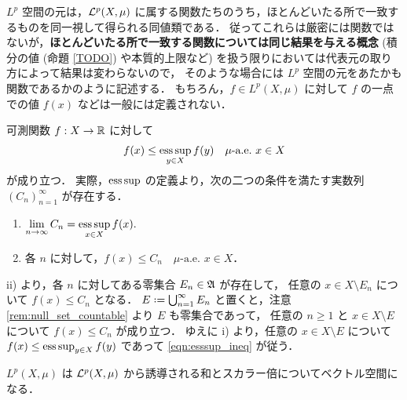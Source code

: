 \begin{remark}
    $L^p$ 空間の元は，$\mathcal{L}^p(X,\mu)$ に属する関数たちのうち，ほとんどいたる所で一致するものを同一視して得られる同値類である．
    従ってこれらは厳密には関数ではないが，\textbf{ほとんどいたる所で一致する関数については同じ結果を与える概念}
    (積分の値 (命題 \ref{TODO}) や本質的上限など) を扱う限りにおいては代表元の取り方によって結果は変わらないので，
    そのような場合には $L^p$ 空間の元をあたかも関数であるかのように記述する．
    もちろん，$f\in L^p(X,\mu)$ に対して $f$ の一点での値 $f(x)$ などは一般には定義されない．
\end{remark}

\begin{remark}\label{rem:pointwise_esssup}
    可測関数 $f:X\to\mathbb{R}$ に対して
    \begin{align}
        f(x)\le\operatorname*{ess\,sup}_{y\in X}f(y)\quad\text{$\mu$-a.e.\ $x\in X$}
        \label{eqn:esssup_ineq}
    \end{align}
    が成り立つ．
    実際，$\operatorname*{ess\,sup}$ の定義より，次の二つの条件を満たす実数列 $(C_n)_{n=1}^\infty$ が存在する．
    \begin{enumerate}
        \item $\displaystyle\lim_{n\to\infty}C_n=\operatorname*{ess\,sup}_{x\in X}f(x).$
        \item 各 $n$ に対して，$f(x)\le C_n\quad\text{$\mu$-a.e.\ $x\in X$}$．
    \end{enumerate}
    \textrm{ii)} より，各 $n$ に対してある零集合 $E_n\in\mathfrak{A}$ が存在して，
    任意の $x\in X\setminus E_n$ について $f(x)\le C_n$ となる．
    $E\defeq\bigcup_{n=1}^\infty E_n$ と置くと，注意 \ref{rem:null_set_countable} より $E$ も零集合であって，
    任意の $n\ge1$ と $x\in X\setminus E$ について $f(x)\le C_n$ が成り立つ．
    ゆえに \textrm{i)} より，任意の $x\in X\setminus E$ について $f(x)\le\operatorname*{ess\,sup}_{y\in X}f(y)$ であって
    \eqref{eqn:esssup_ineq} が従う．
\end{remark}

\begin{proposition}
    $L^p(X,\mu)$ は $\mathcal{L}^p(X,\mu)$ から誘導される和とスカラー倍についてベクトル空間になる．
\end{proposition}

